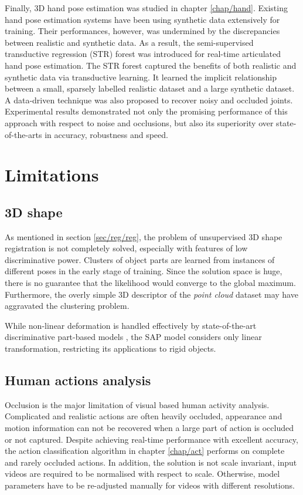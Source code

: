 Finally, 3D hand pose estimation was studied in chapter \ref{chap/hand}. 
Existing hand pose estimation systems have been using synthetic data extensively for training. Their performances, however, was undermined by the discrepancies between realistic and synthetic data. As a result, the semi-supervised transductive regression (STR) forest was introduced for real-time articulated hand pose estimation. 
The STR forest captured the benefits of both realistic and synthetic data via transductive learning. 
It learned the implicit relationship between a small, sparsely labelled realistic dataset and a large synthetic dataset. A data-driven technique was also proposed to recover noisy and occluded joints. 
Experimental results demonstrated not only the promising performance of this approach with respect to noise and occlusions, but also its superiority over state-of-the-arts in accuracy, robustness and speed.

\section{Limitations}

\subsection{3D shape} 

As mentioned in section \ref{sec/reg/reg}, the problem of unsupervised 3D shape registration is not completely solved, especially with features of low discriminative power. Clusters of object parts are learned from instances of different poses in the early stage of training. Since the solution space is huge, there is no guarantee that the likelihood would converge to the global maximum. Furthermore, the overly simple 3D descriptor of the \emph{point cloud} dataset may have aggravated the clustering problem.   

While non-linear deformation is handled effectively by state-of-the-art discriminative part-based models \cite{Felzenszwalb2010, Andriluka2009, Pishchulin2012}, the SAP model considers only linear transformation, restricting its applications to rigid objects. 

\subsection{Human actions analysis} 

Occlusion is the major limitation of visual based human activity analysis. 
Complicated and realistic actions are often heavily occluded, appearance and motion information can not be recovered when a large part of action is occluded or not captured. Despite achieving real-time performance with excellent accuracy, the action classification algorithm in chapter \ref{chap/act} performs on complete and rarely occluded actions. 
In addition, the solution is not scale invariant, input videos are required to be normalised with respect to scale. Otherwise, model parameters have to be re-adjusted manually for videos with different resolutions.  

